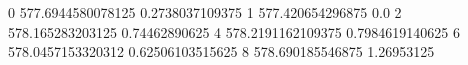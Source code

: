 0 577.6944580078125 0.2738037109375
1 577.420654296875 0.0
2 578.165283203125 0.74462890625
4 578.2191162109375 0.7984619140625
6 578.0457153320312 0.62506103515625
8 578.690185546875 1.26953125
